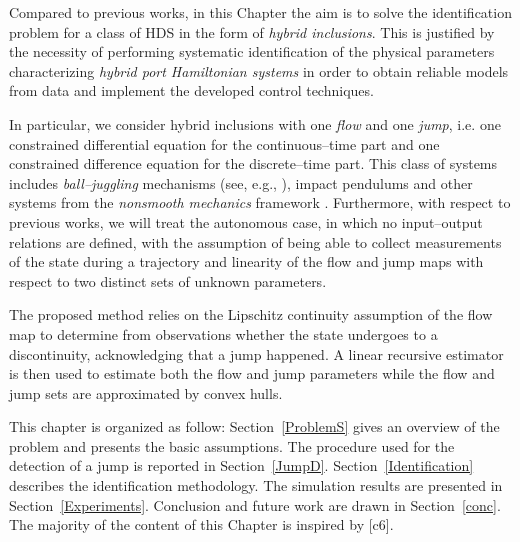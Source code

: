 Compared to previous works, in this Chapter the aim is to solve the identification problem for a class of HDS in the form of \textit{hybrid inclusions}. This is justified by the necessity of performing systematic identification of the physical parameters characterizing \textit{hybrid port Hamiltonian systems} in order to obtain reliable models from data and implement the developed control techniques.

In particular, we consider hybrid inclusions with one \textit{flow} and one \textit{jump}, i.e. one constrained differential equation for the continuous--time part and one constrained difference equation for the discrete--time part. This class of systems includes \textit{ball--juggling} mechanisms (see, e.g., \citealp{tian2013}), impact pendulums and other systems from the \textit{nonsmooth mechanics} framework \citep{brogliato1999nonsmooth}. Furthermore, with respect to previous works, we will treat the autonomous case, in which no input--output relations are defined, with the assumption of being able to collect measurements of the state during a trajectory and linearity of the flow and jump maps with respect to two distinct sets of unknown parameters. 

The proposed method relies on the Lipschitz continuity assumption of the flow map to determine from observations whether the state undergoes to a discontinuity, acknowledging that a jump happened. 
A linear recursive estimator is then used to estimate both the flow and jump parameters while the flow and jump sets are approximated by convex hulls.

This chapter is organized as follow: Section~\ref{ProblemS} gives an overview of the problem and presents the basic assumptions. The procedure used for the detection of a jump is reported in Section~\ref{JumpD}. Section~\ref{Identification} describes the identification methodology. The simulation results are presented in Section~\ref{Experiments}. Conclusion and future work are drawn in Section~\ref{conc}.
%
The majority of the content of this Chapter is inspired by [c6].
%
